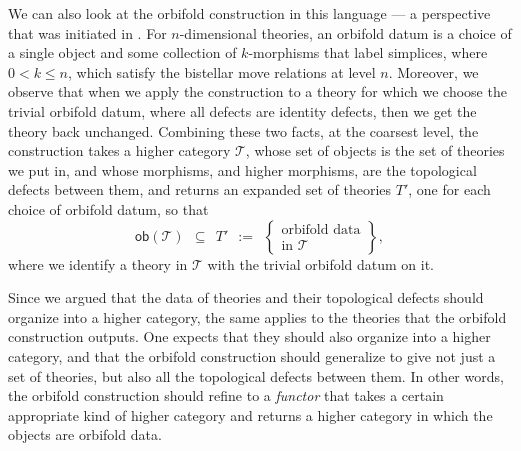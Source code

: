 \documentclass[12pt,a4paper]{article}
\numberwithin{equation}{section}
\begin{document}
We can also look at the orbifold construction in this language --- a perspective that was initiated in \cite{orbifoldnd}. For $n$-dimensional theories, an orbifold datum is a choice of a single object and some collection of $k$-morphisms that label simplices, where $0 < k \leq n$, which satisfy the bistellar move relations at level $n$. Moreover, we observe that when we apply the construction to a theory for which we choose the trivial orbifold datum, where all defects are identity defects, then we get the theory back unchanged. Combining these two facts, at the coarsest level, the construction takes a higher category $\mathscr{T}$, whose set of objects is the set of theories we put in, and whose morphisms, and higher morphisms, are the topological defects between them, and returns an expanded set of theories $T'$, one for each choice of orbifold datum, so that
%
\begin{equation}
    \mathsf{ob}(\mathscr{T}) \ \ \subseteq \ \ T' \ \ := \ \ \left\{ \begin{gathered}
        \text{orbifold data} \\ \text{in } \mathscr{T}
    \end{gathered} \right\},
\end{equation}
%
where we identify a theory in $\mathscr{T}$ with the trivial orbifold datum on it.

Since we argued that the data of theories and their topological defects should organize into a higher category, the same applies to the theories that the orbifold construction outputs. One expects that they should also organize into a higher category, and that the orbifold construction should generalize to give not just a set of theories, but also all the topological defects between them. In other words, the orbifold construction should refine to a \emph{functor} that takes a certain appropriate kind of higher category and returns a higher category in which the objects are orbifold data.
\end{document}
